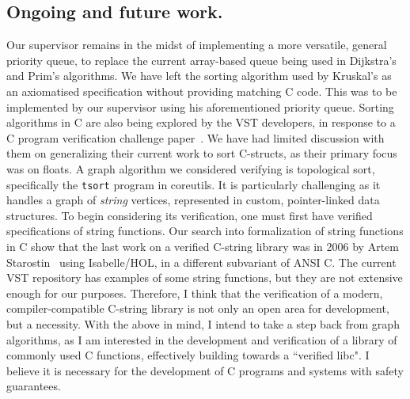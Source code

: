 \subsection{Ongoing and future work.}
Our supervisor remains in the midst of implementing a more versatile, general priority queue, to replace the current array-based queue being used in Dijkstra's and Prim's algorithms.
\newline\newline
We have left the sorting algorithm used by Kruskal's as an axiomatised specification without providing matching C code. This was to be implemented by our supervisor using his aforementioned priority queue. Sorting algorithms in C are also being explored by the VST developers, in response to a C program verification challenge paper~\cite{DBLP:journals/corr/abs-1904-01009}. We have had limited discussion with them on generalizing their current work to sort C-structs, as their primary focus was on floats.
\newline\newline
A graph algorithm we considered verifying is topological sort, specifically the \texttt{tsort} program in coreutils. It is particularly challenging as it handles a graph of \textit{string} vertices, represented in custom, pointer-linked data structures. To begin considering its verification, one must first have verified specifications of string functions. Our search into formalization of string functions in C show that the last work on a verified C-string library was in 2006 by Artem Starostin~\cite{cstring} using Isabelle/HOL, in a different subvariant of ANSI C. The current VST repository has examples of some string functions, but they are not extensive enough for our purposes. Therefore, I think that the verification of a modern, compiler-compatible C-string library is not only an open area for development, but a necessity.
\newline\newline
With the above in mind, I intend to take a step back from graph algorithms, as I am interested in the development and verification of a library of commonly used C functions, effectively building towards a ``verified libc". I believe it is necessary for the development of C programs and systems with safety guarantees. %